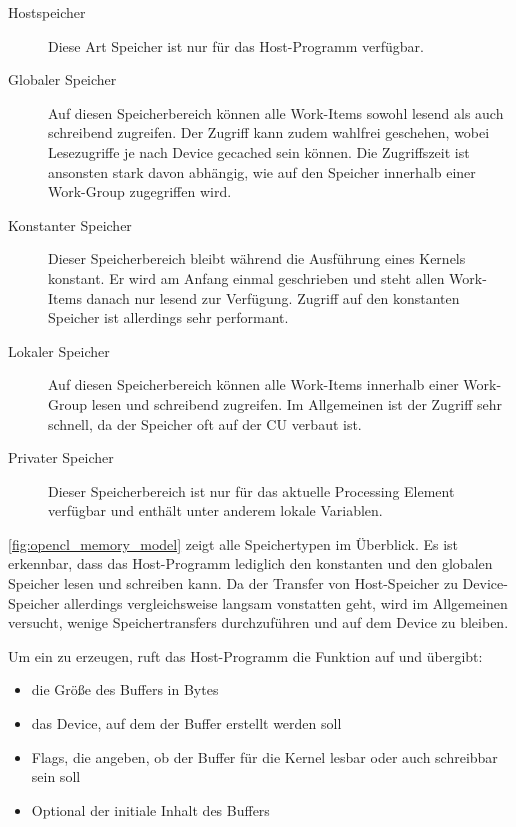\begin{description}
\item[Hostspeicher] Diese Art Speicher ist nur für das Host-Programm
verfügbar.
\item[Globaler Speicher] Auf diesen Speicherbereich können alle
Work-Items sowohl lesend als auch schreibend zugreifen. Der Zugriff
kann zudem wahlfrei geschehen, wobei Lesezugriffe je nach Device
gecached sein können. Die Zugriffszeit ist ansonsten stark davon
abhängig, wie auf den Speicher innerhalb einer Work-Group zugegriffen
wird.
\item[Konstanter Speicher] Dieser Speicherbereich bleibt während die
Ausführung eines Kernels konstant. Er wird am Anfang einmal
geschrieben und steht allen Work-Items danach nur lesend zur
Verfügung. Zugriff auf den konstanten Speicher ist allerdings sehr
performant.
\item[Lokaler Speicher] Auf diesen Speicherbereich können alle
Work-Items innerhalb einer Work-Group lesen und schreibend
zugreifen. Im Allgemeinen ist der Zugriff sehr schnell, da der
Speicher oft auf der CU verbaut ist.
\item[Privater Speicher] Dieser Speicherbereich ist nur für das
aktuelle Processing Element verfügbar und enthält unter anderem lokale
Variablen.
\end{description}

\autoref{fig:opencl_memory_model} zeigt alle Speichertypen im
Überblick. Es ist erkennbar, dass das Host-Programm lediglich den
konstanten und den globalen Speicher lesen und schreiben kann. Da der
Transfer von Host-Speicher zu Device-Speicher allerdings
vergleichsweise langsam vonstatten geht, wird im Allgemeinen versucht,
wenige Speichertransfers durchzuführen und auf dem Device zu bleiben.

Um ein  zu erzeugen, ruft das Host-Programm die Funktion
 auf und übergibt:

\begin{itemize}
\item die Größe des Buffers in Bytes
\item das Device, auf dem der Buffer erstellt werden
soll
\item Flags, die angeben, ob der Buffer für die Kernel lesbar oder
auch schreibbar sein soll
\item Optional der initiale Inhalt des Buffers
\end{itemize}

